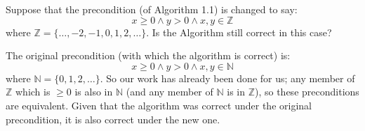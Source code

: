 \documentclass{article}
\newenvironment{prb}[1]
	{\renewcommand\theinner{#1}\inner}
	{\endinner}
\newcommand{\Z}{\mathbb{Z}}
\newcommand{\N}{\mathbb{N}}
\begin{document}
\begin{prb}{1.4}
Suppose that the precondition (of Algorithm 1.1) is changed to say:
$$
x\ge0 \wedge y>0\wedge x,y\in\Z
$$
where $\Z=\{\dots,-2,-1,0,1,2,\dots\}$. Is the Algorithm still correct 
in this case?
\end{prb}

\break
The original precondition (with which the algorithm is correct) is:
$$
x\ge0\wedge y>0\wedge x,y\in\N
$$
where $\N=\{0,1,2,\dots\}$. So our work has already been done for us; 
any member of $\Z$ which is $\ge0$ is also in $\N$ (and any member of $\N$
is in $\Z$), so these preconditions are equivalent. Given that the 
algorithm was correct under the original precondition, it is also
correct under the new one.
\end{document}
